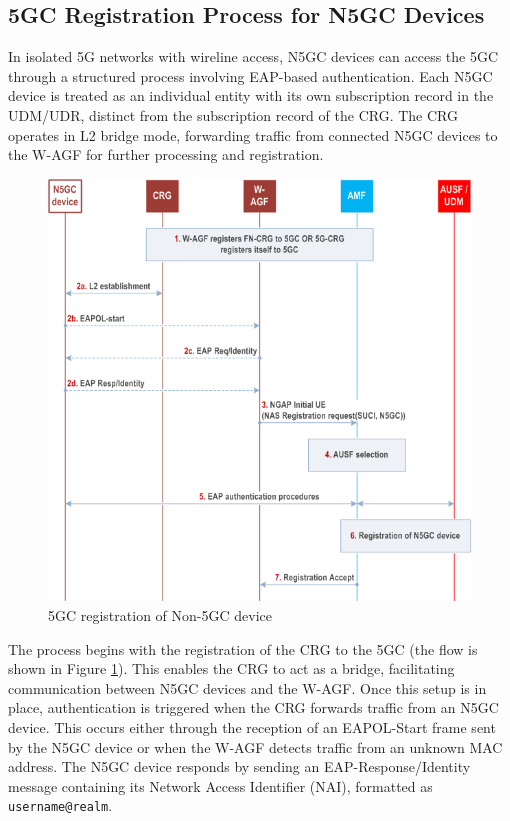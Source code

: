 \subsection{\ac{5GC} Registration Process for \ac{N5GC} Devices}

In isolated \ac{5G} networks with wireline access, \ac{N5GC} devices can access the \ac{5GC} through a structured process involving \ac{EAP}-based authentication. Each \ac{N5GC} device is treated as an individual entity with its own subscription record in the \ac{UDM}/\ac{UDR}, distinct from the subscription record of the \ac{CRG}. The \ac{CRG} operates in L2 bridge mode, forwarding traffic from connected \ac{N5GC} devices to the \ac{W-AGF} for further processing and registration.

\begin{figure}
    \centering
    \includegraphics[width=0.75\linewidth]{figs/5GC registration of Non-5GC device.png}
    \caption{5GC registration of Non-5GC device}
    \label{fig:5GC registration of Non-5GC device}
\end{figure}

The process begins with the registration of the CRG to the 5GC (the flow is shown in Figure \ref{fig:5GC registration of Non-5GC device}). This enables the CRG to act as a bridge, facilitating communication between N5GC devices and the W-AGF. Once this setup is in place, authentication is triggered when the CRG forwards traffic from an N5GC device. This occurs either through the reception of an EAPOL-Start frame sent by the N5GC device or when the W-AGF detects traffic from an unknown MAC address. The N5GC device responds by sending an EAP-Response/Identity message containing its Network Access Identifier (NAI), formatted as \texttt{username@realm}.

